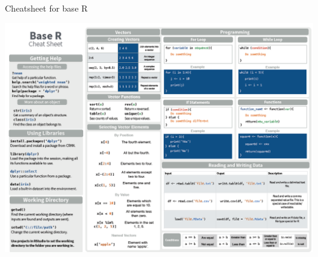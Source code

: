 \documentclass[ignorenonframetext,]{beamer}
\begin{document}
\begin{frame}{Cheatsheet for base R}
\protect\hypertarget{cheatsheet-for-base-r}{}

\includegraphics{../external/images/r_cheatsheet_base.PNG}

\end{frame}
\end{document}
